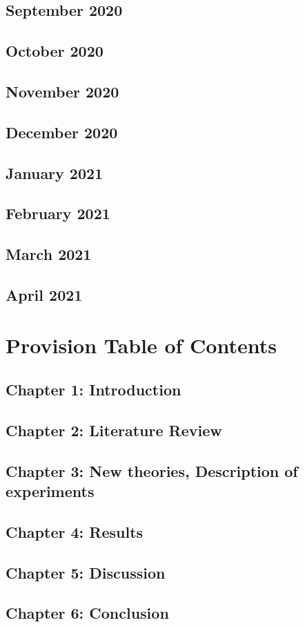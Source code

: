 \documentclass{article}
\begin{document}
	\subsection{September 2020}
	
	\subsection{October 2020}
	
	\subsection{November 2020}
	
	\subsection{December 2020}
	
	\subsection{January 2021}
	
	\subsection{February 2021}
	
	\subsection{March 2021}
	
	\subsection{April 2021}
	\section{Provision Table of Contents}
	\subsection{Chapter 1: Introduction}
	\subsection{Chapter 2: Literature Review}
	\subsection{Chapter 3: New theories, Description of experiments}
	\subsection{Chapter 4: Results}
	\subsection{Chapter 5: Discussion}
	\subsection{Chapter 6: Conclusion}
\end{document}
